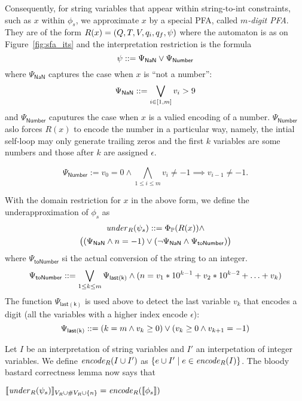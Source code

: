 \documentclass[sigplan,review,anonymous]{acmart}\settopmatter{printfolios=true,printccs=false,printacmref=false}
\begin{document}
Consequently, for string variables that appear within string-to-int constraints, such as $x$ within $\phi_s$, we approximate $x$ by a special PFA, 
called \emph{$m$-digit PFA}. They are of the form $R(x) = (Q,T,V,q_i,q_f,\psi)$ where the automaton is as on Figure~\ref{fig:sfa_its} and the interpretation restriction is the formula
$$
\psi ::= \Psi_{\mathsf{NaN}} \lor \Psi_{\mathsf{Number}}
$$
where $\Psi_{\mathsf{NaN}}$ captures the case when $x$ is ``not a number'': 
$$
\Psi_{\mathsf{NaN}} ::= \bigvee_{i\in [1,m]} v_i>9
$$ 
and $\Psi_{\mathsf{Number}}$ caputures the case when $x$ is a valied encoding of a number. $\Psi_{\mathsf{Number}}$ aslo forces $R(x)$ to encode the number in a particular way, namely, the intial self-loop may only generate trailing zeros and %
the first $k$ variables are some numbers and those after $k$ are assigned $\epsilon$. 

$$
\Psi_{\mathsf{Number}}:= v_0 = 0 \land \bigwedge_{1\leq i \leq m} v_i \neq -1 \implies v_{i-1}\neq -1.
$$

With the domain restriction for $x$ in the above form,
we define the underapproximation of $\phi_s$ as
\begin{multline*}
\mathit{under}_R(\psi_s) 
::= 
\Phi_{\mathbb{P}}(R(x)) 
\land \\
\bigl((\Psi_{\mathsf{NaN}} \land n = -1) 
\lor 
(\neg\Psi_{\mathsf{NaN}} \land \Psi_{\mathsf{toNumber}})\bigr)
\end{multline*}
where $\Psi_{\mathsf{toNumber}}$ si the actual conversion of the string to an integer.
$$
\Psi_{\mathsf{toNumber}}::= \bigvee_{1\leq k \leq m} \Psi_{\mathsf{last(k)}} \land (n = v_1* 10^{k-1} + v_2* 10^{k-2} + \ldots + v_{k})
$$
The function $\Psi_{\mathsf{last(k)}}$ is used above to detect the last variable $v_k$ that encodes a digit (all the variables with a higher index encode $\epsilon$):
$$
\Psi_{\mathsf{last(k)}} ::= (k = m \land v_k \geq 0) \lor (v_{k} \geq 0 \land v_{k+1} = -1)
$$

Let $I$ be an interpretation of string variables and $I'$ an interpetation of integer variables. We define $\mathit{encode}_{R} {(I\cup I')}$ as $\{e \cup I' \mid e\in \mathit{encode}_{R}(I)\}$. 
The bloody bastard correctness lemma now says that 
\begin{lemma}
$
[\![\mathit{under}_R(\psi_s) ]\!]_{V_R \cup \#V_R \cup \{n\}} = \mathit{encode}_{R}([\![\phi_s]\!])
$
\end{lemma}
\end{document}
